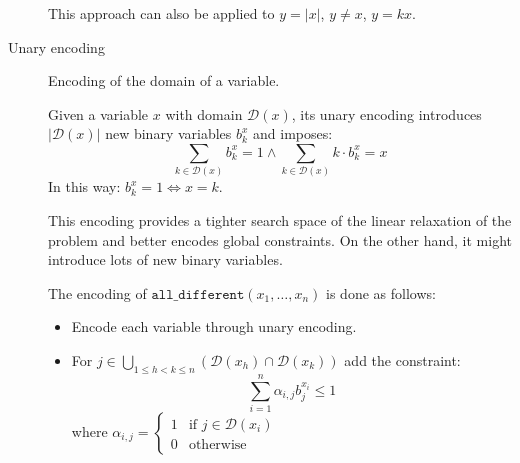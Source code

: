 \begin{description}
        \begin{remark}
            This approach can also be applied to $y = \vert x \vert$, $y \neq x$, $y = kx$.
        \end{remark}


    \item[Unary encoding] 
        Encoding of the domain of a variable.

        Given a variable $x$ with domain $\mathcal{D}(x)$,
        its unary encoding introduces $\vert \mathcal{D}(x) \vert$ new binary variables $b_k^x$ and imposes:
        \[ \sum_{k \in \mathcal{D}(x)} b_k^x = 1 \land \sum_{k \in \mathcal{D}(x)} k \cdot b_k^x = x \]
        In this way: $b_k^x = 1 \iff x = k$.
    
        \begin{remark}
            This encoding provides a tighter search space of the linear relaxation of the problem and better encodes global constraints.
            On the other hand, it might introduce lots of new binary variables.
        \end{remark}

        \begin{example}
            The encoding of $\texttt{all\_different}(x_1, \dots, x_n)$ is done as follows:
            \begin{itemize}
                \item Encode each variable through unary encoding.
                \item For $j \in \bigcup_{1 \leq h < k \leq n} (\mathcal{D}(x_h) \cap \mathcal{D}(x_k))$ add the constraint:
                    \[ \sum_{i=1}^{n} \alpha_{i,j} b_j^{x_i} \leq 1 \]
                    where $\alpha_{i,j} = \begin{cases}
                        1 & \text{if $j \in \mathcal{D}(x_i)$} \\
                        0 & \text{otherwise}
                    \end{cases}$
            \end{itemize}


\end{example}
\end{description}
